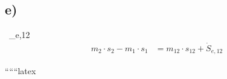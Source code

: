 

\subsection*{e)}
 \, _{e,12}
\begin{align*}
    m_2 \cdot s_2 - m_1 \cdot s_1 &= m_{12} \cdot s_{12} + \dot{S}_{e,12}
\end{align*}

``````latex